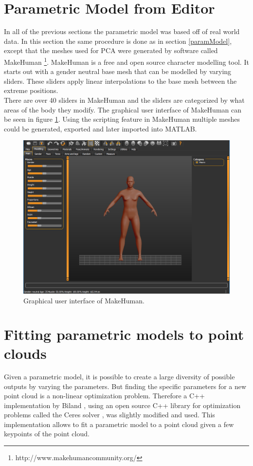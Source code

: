 \section{Parametric Model from Editor}
In all of the previous sections the parametric model was based off of real world data. In this section the same procedure is done as in section \ref{paramModel}, except that the meshes used for PCA were generated by software called MakeHuman \footnote{http://www.makehumancommunity.org/}. MakeHuman is a free and open source character modelling tool. It starts out with a gender neutral base mesh that can be modelled by varying sliders. These sliders apply linear interpolations to the base mesh between the extreme positions.\\
There are over 40 sliders in MakeHuman and the sliders are categorized by what areas of the body they modify. The graphical user interface of MakeHuman can be seen in figure \ref{fig:mhgui}. Using the scripting feature in MakeHuman multiple meshes could be generated, exported and later imported into MATLAB.

\begin{figure}[h]
\centering
\includegraphics[width=1\textwidth]{figures/mhgui}
\caption{Graphical user interface of MakeHuman.}
\label{fig:mhgui}
\end{figure}

\section{Fitting parametric models to point clouds}
Given a parametric model, it is possible to create a large diversity of possible outputs by varying the parameters. But finding the specific parameters for a new point cloud is a non-linear optimization problem. Therefore a C++ implementation by Biland \cite{Biland17}, using an open source C++ library for optimization problems called the Ceres solver \cite{ceres-solver}, was slightly modified and used. This implementation allows to fit a parametric model to a point cloud given a few keypoints of the point cloud.\\

